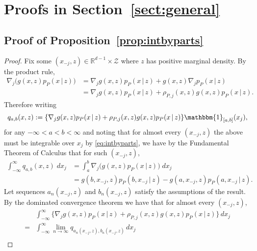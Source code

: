 \documentclass[aos]{imsart}
\newcommand{\ind}{\mathbbm{1}}
\newcommand{\R}{\mathbb{R}}
\newcommand{\given}{\,|\,}
\begin{document}
	\appendix
	
	\newpage
	\section{Proofs in Section~\ref{sect:general}}
	
	\subsection{Proof of Proposition~\ref{prop:intbyparts}}
	
	\begin{proof}
		Fix some $(x_{-j},z) \in \R^{d-1} \times \mathcal{Z}$ where $z$ has positive marginal density. By the product rule,
		\begin{align*}
			\nabla_j \big(g(x,z)p_P(x\given  z)\big) &= \nabla_j g(x,z)p_P(x\given  z) + g(x,z)\nabla_j p_P(x\given  z)\\
			&= \nabla_j g(x,z)p_P(x\given  z) + \rho_{P,j}(x,z)g(x,z)p_P(x\given  z).
		\end{align*}
		Therefore writing
		\[
		q_{a,b}(x, z):= \{\nabla_j g(x,z)p_P(x\given  z) + \rho_{P,j}(x,z)g(x,z)p_P(x\given  z)\}\ind_{[a,b]}(x_j),
		\]
		for any $-\infty<a<b<\infty$ and noting that for almost every $(x_{-j}, z)$ the above must be integrable over $x_j$ by \eqref{eq:intbyparts}, we have by the Fundamental Theorem of Calculus that for such $(x_{-j}, z)$,
		\begin{align*}
			\int_{-\infty}^\infty q_{a,b}(x, z) \; dx_j &= \int_a^b \nabla_j \big(g(x,z)p_P(x\given  z)\big)\; dx_j\\
			& = g(b,x_{-j}, z)p_P(b, x_{-j}\given  z)-g(a,x_{-j},z)p_P(a, x_{-j}\given  z).
		\end{align*}   
Let sequences $a_n(x_{-j}, z)$ and $b_n(x_{-j}, z)$ satisfy the assumptions of the result. By the dominated convergence theorem we have that for almost every $(x_{-j}, z)$,
\begin{align*}
	& \int_{-\infty}^\infty \{ \nabla_j g(x,z)p_P(x \given  z) + \rho_{P,j}(x,z)g(x,z)p_P(x \given  z)\} \, dx_j  \\
	=&  \int_{-\infty}^\infty \lim_{n \to \infty}q_{a_n(x_{-j},z), b_n(x_{-j},z)} \, dx_j \\

\end{align*}
\end{proof}
\end{document}
